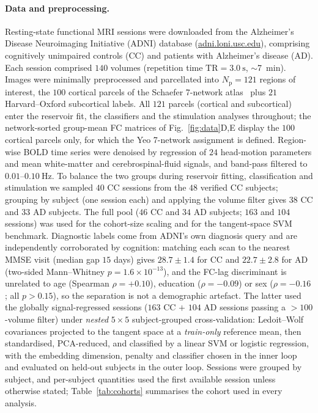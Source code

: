 \documentclass[11pt]{article}
\begin{document}
\paragraph{Data and preprocessing.}
Resting-state functional MRI sessions were downloaded from the Alzheimer's
Disease Neuroimaging Initiative (ADNI) database
(\href{https://adni.loni.usc.edu}{adni.loni.usc.edu}), comprising cognitively
unimpaired controls (CC) and patients with Alzheimer's disease (AD). Each session
comprised $140$ volumes (repetition time $\mathrm{TR}=\SI{3.0}{\second}$,
$\sim$\SI{7}{\minute}). Images were minimally preprocessed and parcellated into
$N_{\mathrm{p}}=121$ regions of interest, the $100$ cortical parcels of the
Schaefer 7-network atlas~\cite{schaefer2018} plus $21$ Harvard--Oxford
subcortical labels. All $121$ parcels (cortical and subcortical) enter the
reservoir fit, the classifiers and the stimulation analyses throughout; the
network-sorted group-mean FC matrices of Fig.~\ref{fig:data}D,E display the
$100$ cortical parcels only, for which the Yeo 7-network assignment is defined.
Region-wise BOLD time series were denoised by regression of $24$ head-motion
parameters and mean white-matter and cerebrospinal-fluid signals, and
band-pass filtered to $0.01$--$\SI{0.10}{\hertz}$. To balance the two groups
during reservoir fitting, classification and stimulation we sampled $40$ CC
sessions from the $48$ verified CC subjects; grouping by subject (one session
each) and applying the volume filter gives $38$ CC and $33$ AD subjects. The full
pool ($46$ CC and $34$ AD subjects; $163$ and $104$ sessions) was used for the
cohort-size scaling and for the tangent-space SVM benchmark.
Diagnostic labels come from ADNI's own diagnosis query and are independently
corroborated by cognition: matching each scan to the nearest MMSE visit (median
gap $15$ days) gives $28.7\pm1.4$ for CC and $22.7\pm2.8$ for AD (two-sided
Mann--Whitney $p=1.6\times10^{-13}$), and the FC-lag discriminant is unrelated to
age (Spearman $\rho=+0.10$), education ($\rho=-0.09$) or sex ($\rho=-0.16$; all
$p>0.15$), so the separation is not a demographic artefact. The latter used the
globally signal-regressed sessions ($163$ CC $+$ $104$ AD sessions passing a
$>$$100$-volume filter) under \emph{nested} $5\times5$ subject-grouped
cross-validation: Ledoit--Wolf covariances projected to the tangent space at a
\emph{train-only} reference mean, then standardised, PCA-reduced, and classified
by a linear SVM or logistic regression, with the embedding dimension, penalty and
classifier chosen in the inner loop and evaluated on held-out subjects in the
outer loop.
Sessions were grouped by subject, and per-subject quantities used the first
available session unless otherwise stated; Table~\ref{tab:cohorts} summarises the
cohort used in every analysis.
\end{document}
